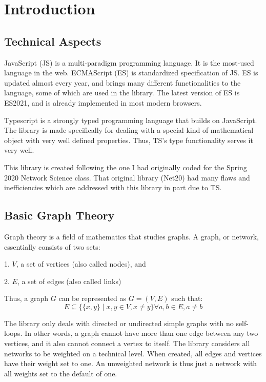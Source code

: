 \chapter{Introduction}

\section{Technical Aspects}

JavaScript (JS) is a multi-paradigm programming language. It is the most-used language in the web. ECMAScript (ES) is standardized specification of JS. ES is updated almost every year, and brings many different functionalities to the language, some of which are used in the library. The latest version of ES is ES2021, and is already implemented in most modern browsers.

Typescript is a strongly typed programming language that builds on JavaScript. The library is made specifically for dealing with a special kind of mathematical object with very well defined properties. Thus, TS's type functionality serves it very well.

This library is created following the one I had originally coded for the Spring 2020 Network Science class. That original library (Net20) had many flaws and inefficiencies which are addressed with this library in part due to TS.

\section{Basic Graph Theory}

Graph theory is a field of mathematics that studies graphs. A graph, or network, essentially consists of two sets:

1. $V$, a set of vertices (also called nodes), and

2. $E$, a set of edges (also called links)

Thus, a graph $G$ can be represented as $G=(V,E)$ such that:
$$E\subseteq \{\{x,y\}\mid x,y\in V, x\ne y\}\forall a,b \in E, a\ne b$$

The library only deals with directed or undirected simple graphs with no self-loops. In other words, a graph cannot have more than one edge between any two vertices, and it also cannot connect a vertex to itself. The library considers all networks to be weighted on a technical level. When created, all edges and vertices have their weight set to one. An unweighted network is thus just a network with all weights set to the default of one.